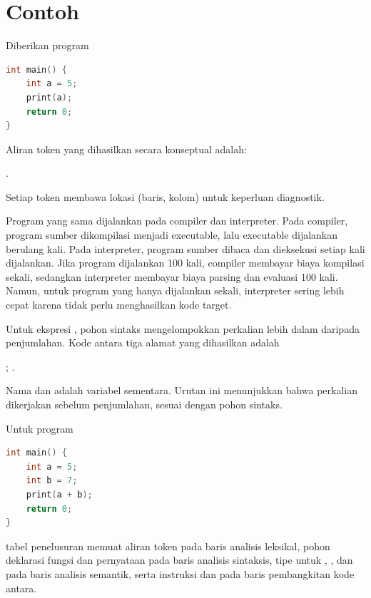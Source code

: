 \section*{Contoh}

\begin{contoh}
Diberikan program
\begin{lstlisting}[language=C]
int main() {
    int a = 5;
    print(a);
    return 0;
}
\end{lstlisting}
Aliran token yang dihasilkan secara konseptual adalah:
\begin{center}
\small
{}    
    
    
    .
\end{center}
Setiap token membawa lokasi (baris, kolom) untuk keperluan diagnostik.
\end{contoh}

\begin{contoh}
Program yang sama dijalankan pada compiler dan interpreter. Pada
compiler, program sumber dikompilasi menjadi executable, lalu
executable dijalankan berulang kali. Pada interpreter, program sumber
dibaca dan dieksekusi setiap kali dijalankan. Jika program dijalankan
100 kali, compiler membayar biaya kompilasi sekali, sedangkan
interpreter membayar biaya parsing dan evaluasi 100 kali. Namun, untuk
program yang hanya dijalankan sekali, interpreter sering lebih cepat
karena tidak perlu menghasilkan kode target.
\end{contoh}

\begin{contoh}
Untuk ekspresi , pohon sintaks mengelompokkan
perkalian lebih dalam daripada penjumlahan. Kode antara tiga alamat
yang dihasilkan adalah
\begin{center}
\small
{}; .
\end{center}
Nama  dan  adalah variabel sementara. Urutan ini
menunjukkan bahwa perkalian dikerjakan sebelum penjumlahan, sesuai
dengan pohon sintaks.
\end{contoh}

\begin{contoh}
Untuk program
\begin{lstlisting}[language=C]
int main() {
    int a = 5;
    int b = 7;
    print(a + b);
    return 0;
}
\end{lstlisting}
tabel penelusuran memuat aliran token pada baris analisis leksikal,
pohon deklarasi fungsi dan pernyataan  pada baris analisis
sintaksis, tipe  untuk , , dan 
pada baris analisis semantik, serta instruksi  dan
 pada baris pembangkitan kode antara.
\end{contoh}
